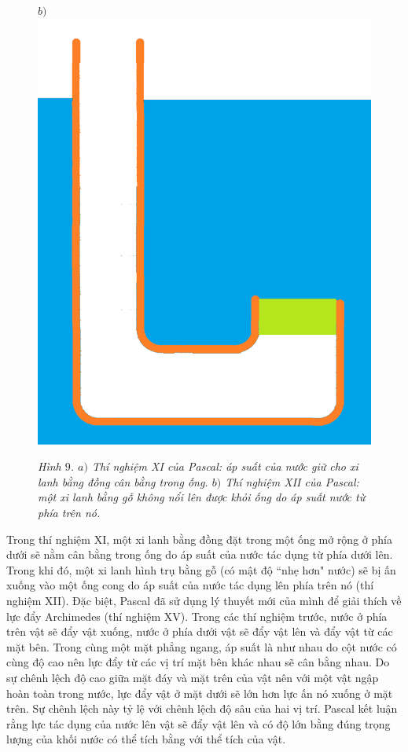 \begin{multicols}{2}
\begin{figure}[H]
		$b)$\includegraphics[height= 0.65\linewidth]{11b}
		\caption{\small\textit{\color{timhieukhoahoc}Hình $9$. $a)$ Thí nghiệm XI của Pascal: áp suất của nước giữ cho xi lanh bằng đồng cân bằng trong ống. $b)$ Thí nghiệm XII của Pascal: một xi lanh bằng gỗ không nổi lên được khỏi ống do áp suất nước từ phía trên nó.}}
		\vspace*{-10pt}
	\end{figure}
	Trong thí nghiệm XI, một xi lanh bằng đồng đặt trong một ống mở rộng ở phía dưới sẽ nằm cân bằng trong ống do áp suất của nước tác dụng từ phía dưới lên. Trong khi đó, một xi lanh hình trụ bằng gỗ (có mật độ ``nhẹ hơn" nước) sẽ bị ấn xuống vào một ống cong do áp suất của nước tác dụng lên phía trên nó (thí nghiệm XII). 
	\vskip 0.1cm
	Đặc biệt, Pascal đã sử dụng lý thuyết mới của mình để giải thích về lực đẩy Archimedes (thí nghiệm XV). Trong các thí nghiệm trước, nước ở phía trên vật sẽ đẩy vật xuống, nước ở phía dưới vật sẽ đẩy vật lên và đẩy vật từ các mặt bên. Trong cùng một mặt phẳng ngang, áp suất là như nhau do cột nước có cùng độ cao nên lực đẩy từ các vị trí mặt bên khác nhau sẽ cân bằng nhau. Do sự chênh lệch độ cao giữa mặt đáy và mặt trên của vật nên với một vật ngập hoàn toàn trong nước, lực đẩy vật ở mặt dưới sẽ lớn hơn lực ấn nó xuống ở mặt trên. Sự chênh lệch này tỷ lệ với chênh lệch độ sâu của hai vị trí. Pascal kết luận rằng lực tác dụng của nước lên vật sẽ đẩy vật lên và có độ lớn bằng đúng trọng lượng của khối nước có thể tích bằng với thể tích của vật.
	\begin{figure}[H]
		\vspace*{-5pt}
		\centering
		\captionsetup{labelformat= empty, justification=centering}

\end{figure}
\end{multicols}
